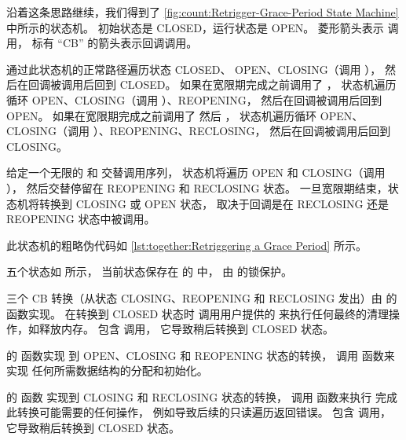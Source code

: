 沿着这条思路继续，我们得到了
\cref{fig:count:Retrigger-Grace-Period State Machine}
中所示的状态机。
初始状态是 CLOSED，运行状态是 OPEN\@。
菱形箭头表示  调用，
标有 ``CB'' 的箭头表示回调调用。

通过此状态机的正常路径遍历状态 CLOSED、
OPEN、CLOSING（调用 ），
然后在回调被调用后回到 CLOSED。
如果在宽限期完成之前调用了 ，
状态机遍历循环 OPEN、CLOSING（调用
）、REOPENING，
然后在回调被调用后回到 OPEN。
如果在宽限期完成之前调用了  然后 ，
状态机遍历循环 OPEN、CLOSING（调用
）、REOPENING、RECLOSING，
然后在回调被调用后回到 CLOSING。

给定一个无限的  和  交替调用序列，
状态机将遍历 OPEN 和 CLOSING（调用 ），
然后交替停留在 REOPENING 和 RECLOSING 状态。
一旦宽限期结束，状态机将转换到
CLOSING 或 OPEN 状态，
取决于回调是在 RECLOSING 还是 REOPENING 状态中被调用。

\begin{listing}
\caption{重触发宽限期（伪代码）}
\label{lst:together:Retriggering a Grace Period}
\end{listing}

此状态机的粗略伪代码如
\cref{lst:together:Retriggering a Grace Period} 所示。
\begin{fcvref}
五个状态如  所示，
当前状态保存在  的  中，
由  的锁保护。

三个 CB 转换（从状态 CLOSING、REOPENING
和 RECLOSING 发出）由
 的  函数实现。
 在转换到 CLOSED 状态时
调用用户提供的 
来执行任何最终的清理操作，如释放内存。
 包含  调用，
它导致稍后转换到 CLOSED 状态。

 的  函数实现
到 OPEN、CLOSING 和 REOPENING 状态的转换，
 调用  函数来实现
任何所需数据结构的分配和初始化。

 的  函数
实现到 CLOSING 和 RECLOSING 状态的转换，
 调用  函数来执行
完成此转换可能需要的任何操作，
例如导致后续的只读遍历返回错误。
 包含  调用，
它导致稍后转换到 CLOSED 状态。
\end{fcvref}

